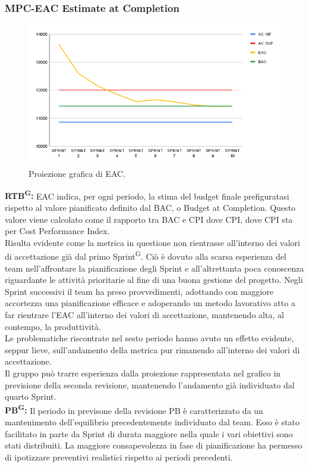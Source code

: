 \documentclass[8pt]{article}
\newcommand{\glossterm}[1]{#1\textsuperscript{G}} %
\begin{document}
\subsubsection{MPC-EAC Estimate at Completion}
\begin{figure}[h!]
    \centering
    \includegraphics[width=1\textwidth]{images_pdq/EAC.png}
    \caption{Proiezione grafica di EAC.}
    \label{fig:Proiezione grafica di EAC}
\end{figure}
\textbf{\glossterm{RTB}:} EAC indica, per ogni periodo, la stima del budget finale prefiguratasi rispetto al valore pianificato definito dal BAC, o Budget at Completion. Questo valore viene calcolato come il rapporto tra BAC e CPI dove CPI, dove CPI sta per Cost Performance Index.\\
Risulta evidente come la metrica in questione non rientrasse all'interno dei valori di accettazione già dal primo \glossterm{Sprint}. Ciò è dovuto alla scarsa esperienza del team nell'affrontare la pianificazione degli Sprint e all'altrettanta poca conoscenza riguardante le attività prioritarie al fine di una buona gestione del progetto. Negli Sprint successivi il team ha preso provvedimenti, adottando con maggiore accortezza una pianificazione efficace e adoperando un metodo lavorativo atto a far rientrare l'EAC all'interno dei valori di accettazione, mantenendo alta, al contempo, la produttività.\\
Le problematiche riscontrate nel sesto periodo hanno avuto un effetto evidente, seppur lieve, sull'andamento della metrica pur rimanendo all'interno dei valori di accettazione.\\
Il gruppo può trarre esperienza dalla proiezione rappresentata nel grafico in previsione della seconda revisione, mantenendo l'andamento già individuato dal quarto Sprint.\\
\textbf{\glossterm{PB}:} Il periodo in previsone della revisione PB è caratterizzato da un mantenimento dell'equilibrio precedentemente individuato dal team. Esso è stato facilitato in parte da Sprint di durata maggiore nella quale i vari obiettivi sono stati distribuiti. La maggiore consapevolezza in fase di pianificazione ha permesso di ipotizzare preventivi realistici rispetto ai periodi precedenti.
\clearpage
\end{document}
